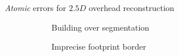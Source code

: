 \documentclass[export]{beamer}
\begin{document}
\begin{frame}[plain]{\emph{Atomic} errors for $2.5D$ overhead reconstruction}
{\begin{figure}
\begin{center}
\begin{subfigure}{.28\textwidth}
                                \caption{\label{fig::bul_over} Building over segmentation}
                            \end{subfigure}
                            \hspace{10pt}
                            \begin{subfigure}{.28\textwidth}
                                \caption{\label{fig::bul_footprint} Imprecise footprint border}
                            \end{subfigure}
                            \hspace{10pt}
                            \begin{subfigure}{.28\textwidth}

\end{subfigure}
\end{center}
\end{figure}}
\end{frame}
\end{document}
